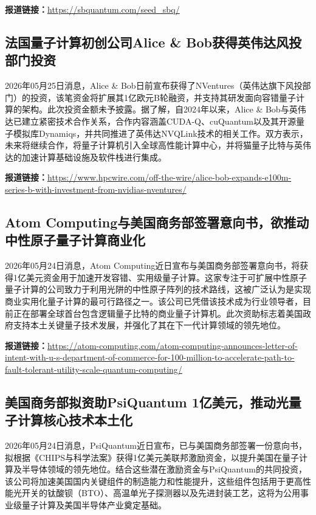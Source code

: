 \documentclass[12pt,a4paper]{ctexart}
\begin{document}
\noindent\textbf{报道链接：}\url{https://sbquantum.com/seed\_sbq/}

\subsection{ 法国量子计算初创公司Alice \& Bob获得英伟达风投部门投资 }

2026年05月25日消息，Alice \& Bob日前宣布获得了NVentures（英伟达旗下风投部门）的投资，该笔资金将扩展其1亿欧元B轮融资，并支持其研发面向容错量子计算的架构。此次投资金额未予披露。据了解，自2024年以来，Alice \& Bob与英伟达已建立紧密技术合作关系，合作内容涵盖CUDA-Q、cuQuantum以及其开源量子模拟库Dynamiqs，并共同推进了英伟达NVQLink技术的相关工作。双方表示，未来将继续合作，将量子计算机引入全球高性能计算中心，并将猫量子比特与英伟达的加速计算基础设施及软件栈进行集成。

\noindent\textbf{报道链接：}\url{https://www.hpcwire.com/off-the-wire/alice-bob-expands-e100m-series-b-with-investment-from-nvidias-nventures/}

\subsection{ Atom Computing与美国商务部签署意向书，欲推动中性原子量子计算商业化 }

2026年05月24日消息，Atom Computing近日宣布与美国商务部签署意向书，将获得1亿美元资金用于加速开发容错、实用级量子计算。这家专注于可扩展中性原子量子计算的公司致力于利用光阱的中性原子阵列的技术路线，这被广泛认为是实现商业实用化量子计算的最可行路径之一。该公司已凭借该技术成为行业领导者，目前正在部署全球首台包含逻辑量子比特的商业量子计算机。此次资助标志着美国政府支持本土关键量子技术发展，并强化了其在下一代计算领域的领先地位。

\noindent\textbf{报道链接：}\url{https://atom-computing.com/atom-computing-announces-letter-of-intent-with-u-s-department-of-commerce-for-100-million-to-accelerate-path-to-fault-tolerant-utility-scale-quantum-computing/}

\subsection{ 美国商务部拟资助PsiQuantum 1亿美元，推动光量子计算核心技术本土化 }

2026年05月24日消息，PsiQuantum近日宣布，已与美国商务部签署一份意向书，拟根据《CHIPS与科学法案》获得1亿美元美联邦激励资金，以提升美国在量子计算及半导体领域的领先地位。结合这些潜在激励资金与PsiQuantum的共同投资，该公司将加速美国国内关键组件的制造能力和性能提升，这些组件包括用于更高性能光开关的钛酸钡（BTO）、高温单光子探测器以及先进封装工艺，这将为公用事业级量子计算及美国半导体产业奠定基础。
\end{document}
